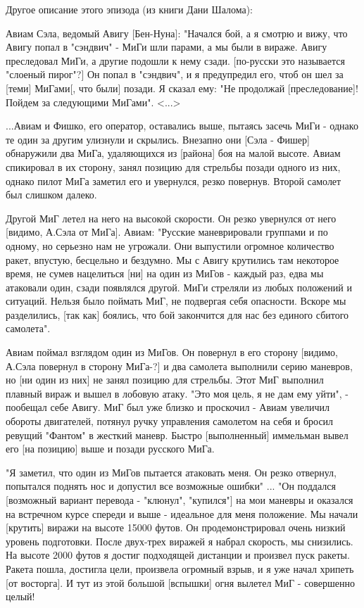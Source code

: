 Другое описание этого эпизода (из книги Дани Шалома):

\begin{textcitation}
	Авиам Сэла, ведомый Авигу [Бен-Нуна]: "Начался бой, а я смотрю и вижу, что Авигу попал в "сэндвич" - МиГи шли парами, а мы были в вираже. Авигу преследовал МиГи, а другие подошли к нему сзади. [по-русски это называется "слоеный пирог"?] Он попал в "сэндвич", и я предупредил его, чтоб он шел за [теми] МиГами[, что были] позади. Я сказал ему: "Не продолжай [преследование]! Пойдем за следующими МиГами". <...>
	
	...Авиам и Фишко, его оператор, оставались выше, пытаясь засечь МиГи - однако те один за другим улизнули и скрылись. Внезапно они [Сэла - Фишер] обнаружили два МиГа, удаляющихся из [района] боя на малой высоте. Авиам спикировал в их сторону, занял позицию для стрельбы позади одного из них, однако пилот МиГа заметил его и увернулся, резко повернув. Второй самолет был слишком далеко.
	
	Другой МиГ летел на него на высокой скорости. Он резко увернулся от него [видимо, А.Сэла от МиГа]. Авиам: "Русские маневрировали группами и по одному, но серьезно нам не угрожали. Они выпустили огромное количество ракет, впустую, бесцельно и бездумно. Мы с Авигу крутились там некоторое время, не сумев нацелиться [ни] на один из МиГов - каждый раз, едва мы атаковали один, сзади появлялся другой. МиГи стреляли из любых положений и ситуаций. Нельзя было поймать МиГ, не подвергая себя опасности. Вскоре мы разделились, [так как] боялись, что бой закончится для нас без единого сбитого самолета".
	
	Авиам поймал взглядом один из МиГов. Он повернул в его сторону [видимо, А.Сэла повернул в сторону МиГа-?] и два самолета выполнили серию маневров, но [ни один из них] не занял позицию для стрельбы. Этот МиГ выполнил плавный вираж и вышел в лобовую атаку. "Это моя цель, я не дам ему уйти", - пообещал себе Авигу. МиГ был уже близко и проскочил - Авиам увеличил обороты двигателей, потянул ручку управления самолетом на себя и бросил ревущий "Фантом" в жесткий маневр. Быстро [выполненный] иммельман вывел его [на позицию] выше и позади русского МиГа.
	
	"Я заметил, что один из МиГов пытается атаковать меня. Он резко отвернул, попытался поднять нос и допустил все возможные ошибки" ... "Он поддался [возможный вариант перевода - "клюнул", "купился"] на мои маневры и оказался на встречном курсе спереди и выше - идеальное для меня положение. Мы начали [крутить] виражи на высоте 15000 футов. Он продемонстрировал очень низкий уровень подготовки. После двух-трех виражей я набрал скорость, мы снизились. На высоте 2000 футов я достиг подходящей дистанции и произвел пуск ракеты. Ракета пошла, достигла цели, произвела огромный взрыв, и я уже начал хрипеть [от восторга]. И тут из этой большой [вспышки] огня вылетел МиГ - совершенно целый!
	

\end{textcitation}
